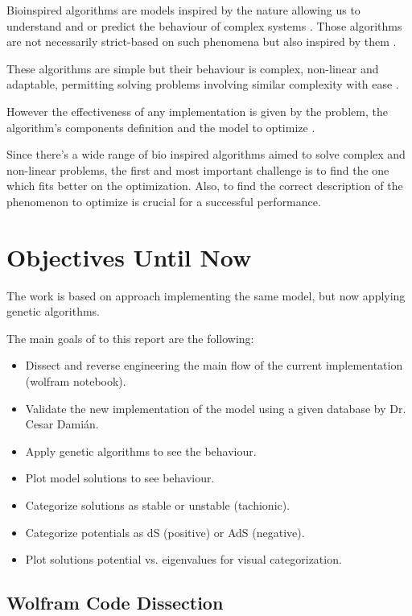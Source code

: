 Bioinspired algorithms are models inspired by the nature
allowing us to understand and or predict the behaviour of
complex systems \cite{Cotta_2017}. Those algorithms are not
necessarily strict-based on such phenomena but also inspired by
them \cite{Game2020}.

These algorithms are simple but their behaviour is complex,
non-linear and adaptable, permitting solving problems involving
similar complexity with ease \cite{Cotta_2017}.

However the effectiveness of any implementation is given by the
problem, the algorithm's components definition and the model
to optimize \cite{Cotta_2017, Yang_2016}.

Since there's a wide range of bio inspired algorithms aimed to
solve complex and non-linear problems, the first and most
important challenge is to find the one which fits better on the
optimization. Also, to find the correct description of the
phenomenon to optimize is crucial for a successful performance.


\section{Objectives Until Now}

The work is based on \cite{Damian_2022} approach implementing
the same model, but now applying genetic algorithms.

The main goals of to this report are the following:

\begin{itemize}
   \item Dissect and reverse engineering the main flow of the
      current implementation (wolfram notebook).
   \item Validate the new implementation of the model using a given
      database by Dr. Cesar Dami\'an.
   \item Apply genetic algorithms to see the behaviour.
   \item Plot model solutions to see behaviour.
   \item Categorize solutions as stable or unstable (tachionic).
   \item Categorize potentials as dS (positive) or AdS (negative).
   \item Plot solutions potential vs. eigenvalues for visual
      categorization.
\end{itemize}

\subsection{Wolfram Code Dissection}

